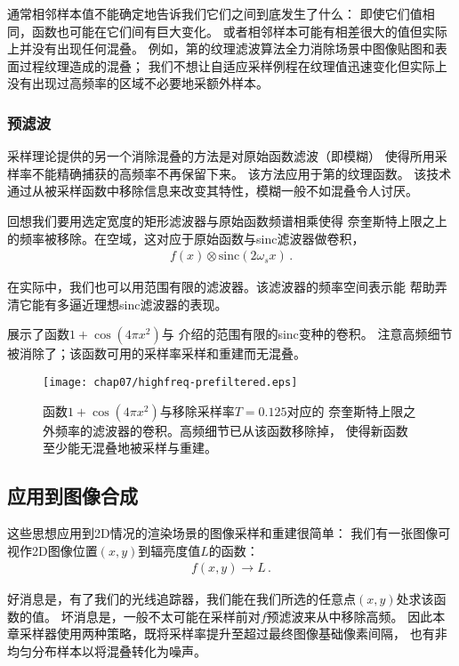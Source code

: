 通常相邻样本值不能确定地告诉我们它们之间到底发生了什么：
即使它们值相同，函数也可能在它们间有巨大变化。
或者相邻样本可能有相差很大的值但实际上并没有出现任何混叠。
例如，第的纹理滤波算法全力消除场景中图像贴图和表面过程纹理造成的混叠；
我们不想让自适应采样例程在纹理值迅速变化但实际上没有出现过高频率的区域不必要地采额外样本。

\subsubsection*{预滤波}
采样理论提供的另一个消除混叠的方法是对原始函数滤波（即模糊）
使得所用采样率不能精确捕获的高频率不再保留下来。
该方法应用于第的纹理函数。
该技术通过从被采样函数中移除信息来改变其特性，模糊一般不如混叠令人讨厌。

回想我们要用选定宽度的矩形滤波器与原始函数频谱相乘使得
奈奎斯特上限之上的频率被移除。在空域，这对应于原始函数与sinc滤波器做卷积，
\begin{align*}
    f(x)\otimes \mathrm{sinc}(2\omega_sx)\, .
\end{align*}

在实际中，我们也可以用范围有限的滤波器。该滤波器的频率空间表示能
帮助弄清它能有多逼近理想sinc滤波器的表现。

展示了函数$1+\cos(4\pi x^2)$与
介绍的范围有限的sinc变种的卷积。
注意高频细节被消除了；该函数可用的采样率采样和重建而无混叠。
\begin{figure}[htbp]
    \centering\texttt{[image: chap07/highfreq-prefiltered.eps]}
    \caption{函数$1+\cos(4\pi x^2)$与移除采样率$T=0.125$对应的
        奈奎斯特上限之外频率的滤波器的卷积。高频细节已从该函数移除掉，
        使得新函数至少能无混叠地被采样与重建。}
    \label{fig:7.10}
\end{figure}

\subsection{应用到图像合成}\label{sub:应用到图像合成}
这些思想应用到2D情况的渲染场景的图像采样和重建很简单：
我们有一张图像可视作2D图像位置$(x,y)$到辐亮度值$L$的函数：
\begin{align*}
    f(x,y)\rightarrow L\, .
\end{align*}

好消息是，有了我们的光线追踪器，我们能在我们所选的任意点$(x,y)$处求该函数的值。
坏消息是，一般不太可能在采样前对$f$预滤波来从中移除高频。
因此本章采样器使用两种策略，既将采样率提升至超过最终图像基础像素间隔，
也有非均匀分布样本以将混叠转化为噪声。

